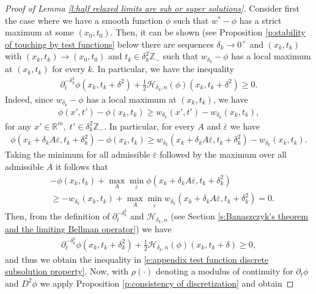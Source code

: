 \documentclass[reqno]{amsart}
\numberwithin{equation}{section}
\begin{document}
\begin{proof}[Proof of Lemma \ref{l:half relaxed limits are sub or super solutions}]
  Consider first the case where we have a smooth function $\phi$ such that $w^*-\phi$ has a strict maximum at some $(x_0,t_0)$. Then, it can be shown (see Proposition \ref{p:stability of touching by test functions} below there are sequences $\delta_k \to 0^+$ and $(x_k,t_k)$ with $(x_k,t_k) \to (x_0,t_0)$ and $t_k \in \delta_k^2\mathbb{Z}_{-}$ such that $w_{\delta_k}-\phi$ has a local maximum at $(x_k,t_k)$ for every $k$. In particular, we have the inequality 
  \begin{align}\label{e:appendix test function discrete subsolution property}
    \partial_t^{-\delta_k^2}\phi(x_k,t_k+\delta^2) + \tfrac{1}{2}\mathcal{H}_{\delta_k,n}(\phi)(x_k,t_k+\delta^2) \geq 0.
  \end{align}
  Indeed, since $w_{\delta_k}-\phi$ has a local maximum at $(x_k,t_k)$, we have
\begin{align*}
    \phi(x',t')-\phi(x_k,t_k) \geq w_{\delta_k}(x',t')-w_{\delta_k}(x_k,t_k),    
  \end{align*}
  for any $x'\in\mathbb{R}^m,\;t'\in\delta^2_k\mathbb{Z}_-$. In particular, for every $A$ and $\overline \varepsilon$ we have
  \begin{align*}
    \phi(x_k+\delta_k A\overline \varepsilon,t_k+\delta_k^2)-\phi(x_k,t_k) \geq w_{\delta_k}(x_k+\delta_k A\overline \varepsilon,t_k+\delta_k^2)-w_{\delta_k}(x_k,t_k). 
  \end{align*}
  Taking the minimum for all admissible $\overline \varepsilon$ followed by the maximum over all admissible $A$ it follows that 
  \begin{align*}
    & -\phi(x_k,t_k)+ \max_A \min_{\overline \varepsilon}\phi(x_k+\delta_k A\overline \varepsilon,t_k+\delta_k^2) \\
    & \geq -w_{\delta_k}(x_k,t_k) + \max_A \min_{\overline \varepsilon} w_{\delta_k}(x_k+\delta_k A\overline \varepsilon,t_k+\delta_k^2) = 0.
  \end{align*}
  Then, from the definition of $\partial_t^{-\delta_k^2}$ and $\mathcal{H}_{\delta_k,n}$ (see Section \ref{s:Banaszczyk's theorem and the limiting Bellman operator}) we have 
  \begin{align*}
    \partial_t^{-\delta_k^2}\phi(x_k,t_k+\delta_k^2) + \tfrac{1}{2}\mathcal{H}_{\delta_k,n}(\phi)(x_k,t_k+\delta)  \geq 0,
  \end{align*}
  and thus we obtain the inequality in \eqref{e:appendix test function discrete subsolution property}. Now, with $\rho(\cdot)$ denoting a modulus of continuity for $\partial_t\phi$ and $D^2\phi$ we apply Proposition \ref{p:consistency of discretization} and obtain

\end{proof}
\end{document}
